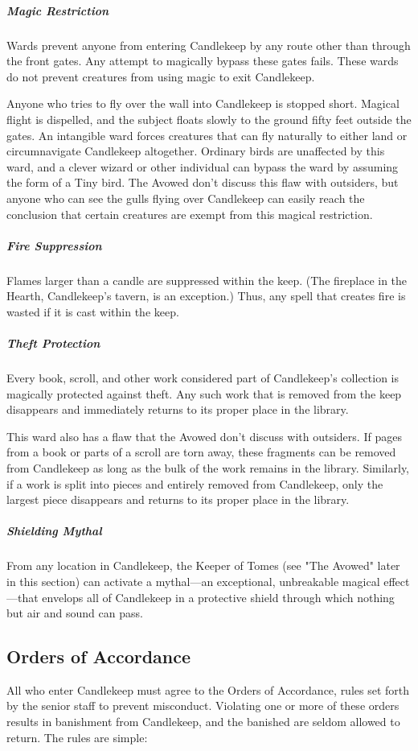 \documentclass[10pt,a4paper,twoside,bg=print,twocolumn,openany,nodeprecatedcode]{dndbook}
\begin{document}
\subparagraph{Magic Restriction}
Wards prevent anyone from entering Candlekeep by any route other than through the front gates. Any attempt to magically bypass these gates fails. These wards do not prevent creatures from using magic to exit Candlekeep.

Anyone who tries to fly over the wall into Candlekeep is stopped short. Magical flight is dispelled, and the subject floats slowly to the ground fifty feet outside the gates. An intangible ward forces creatures that can fly naturally to either land or circumnavigate Candlekeep altogether. Ordinary birds are unaffected by this ward, and a clever wizard or other individual can bypass the ward by assuming the form of a Tiny bird. The Avowed don't discuss this flaw with outsiders, but anyone who can see the gulls flying over Candlekeep can easily reach the conclusion that certain creatures are exempt from this magical restriction. 

\subparagraph{Fire Suppression}
Flames larger than a candle are suppressed within the keep. (The fireplace in the Hearth, Candlekeep's tavern, is an exception.) Thus, any spell that creates fire is wasted if it is cast within the keep.

\subparagraph{Theft Protection}
Every book, scroll, and other work considered part of Candlekeep's collection is magically protected against theft. Any such work that is removed from the keep disappears and immediately returns to its proper place in the library.

This ward also has a flaw that the Avowed don't discuss with outsiders. If pages from a book or parts of a scroll are torn away, these fragments can be removed from Candlekeep as long as the bulk of the work remains in the library. Similarly, if a work is split into pieces and entirely removed from Candlekeep, only the largest piece disappears and returns to its proper place in the library.

\subparagraph{Shielding Mythal}
From any location in Candlekeep, the Keeper of Tomes (see "The Avowed" later in this section) can activate a mythal—an exceptional, unbreakable magical effect—that envelops all of Candlekeep in a protective shield through which nothing but air and sound can pass.

\subsection{Orders of Accordance}
All who enter Candlekeep must agree to the Orders of Accordance, rules set forth by the senior staff to prevent misconduct. Violating one or more of these orders results in banishment from Candlekeep, and the banished are seldom allowed to return. The rules are simple:
\end{document}
